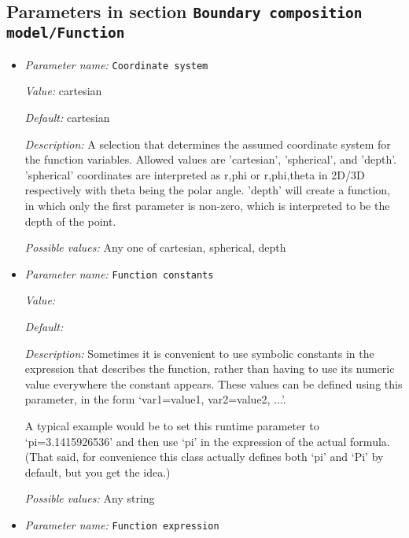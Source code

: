 \subsection{Parameters in section \tt Boundary composition model/Function}
\label{parameters:Boundary_20composition_20model/Function}

\begin{itemize}
\item {\it Parameter name:} {\tt Coordinate system}
\label{parameters:Boundary composition model/Function/Coordinate system}


{\it Value:} cartesian


{\it Default:} cartesian


{\it Description:} A selection that determines the assumed coordinate system for the function variables. Allowed values are 'cartesian', 'spherical', and 'depth'. 'spherical' coordinates are interpreted as r,phi or r,phi,theta in 2D/3D respectively with theta being the polar angle. 'depth' will create a function, in which only the first parameter is non-zero, which is interpreted to be the depth of the point.


{\it Possible values:} Any one of cartesian, spherical, depth
\item {\it Parameter name:} {\tt Function constants}
\label{parameters:Boundary composition model/Function/Function constants}


{\it Value:} 


{\it Default:} 


{\it Description:} Sometimes it is convenient to use symbolic constants in the expression that describes the function, rather than having to use its numeric value everywhere the constant appears. These values can be defined using this parameter, in the form `var1=value1, var2=value2, ...'.

A typical example would be to set this runtime parameter to `pi=3.1415926536' and then use `pi' in the expression of the actual formula. (That said, for convenience this class actually defines both `pi' and `Pi' by default, but you get the idea.)


{\it Possible values:} Any string
\item {\it Parameter name:} {\tt Function expression}
\label{parameters:Boundary composition model/Function/Function expression}



\end{itemize}
